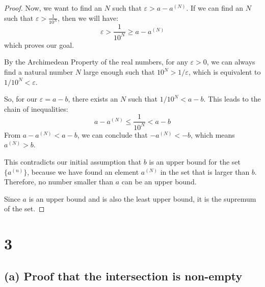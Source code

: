 \documentclass[12pt,a4paper]{article}
\theoremstyle{definition}
\theoremstyle{remark}
\begin{document}
\begin{proof}
Now, we want to find an $N$ such that $\varepsilon > a - a^{(N)}$. If we can find an $N$ such that $\varepsilon > \frac{1}{10^N}$, then we will have:
\[ \varepsilon > \frac{1}{10^N} \ge a - a^{(N)} \]
which proves our goal.

By the Archimedean Property of the real numbers, for any $\varepsilon > 0$, we can always find a natural number $N$ large enough such that $10^N > 1/\varepsilon$, which is equivalent to $1/10^N < \varepsilon$.

So, for our $\varepsilon = a - b$, there exists an $N$ such that $1/10^N < a - b$.
This leads to the chain of inequalities:
\[ a - a^{(N)} \le \frac{1}{10^N} < a - b \]
From $a - a^{(N)} < a - b$, we can conclude that $-a^{(N)} < -b$, which means $a^{(N)} > b$.

This contradicts our initial assumption that $b$ is an upper bound for the set $\{a^{(n)}\}$, because we have found an element $a^{(N)}$ in the set that is larger than $b$.
Therefore, no number smaller than $a$ can be an upper bound.

Since $a$ is an upper bound and is also the least upper bound, it is the supremum of the set.
\end{proof}



\section*{3}

\subsection*{(a) Proof that the intersection is non-empty}
\end{document}
